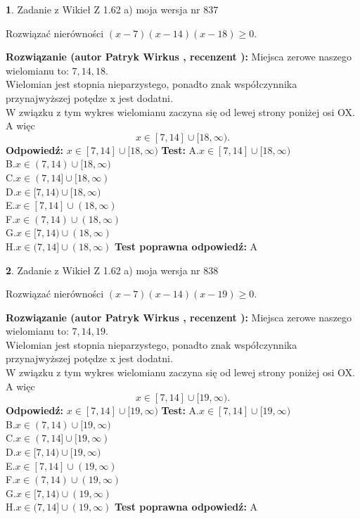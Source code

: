 \documentclass[12pt, a4paper]{article}
\theoremstyle{definition} %
\newtheorem{zad}{}
\newcommand{\zadStart}[1]{\begin{zad}#1\newline}
\newcommand{\zadStop}{\end{zad}}
\newcommand{\rozwStart}[2]{\noindent \textbf{Rozwiązanie (autor #1 , recenzent #2): }\newline}
\newcommand{\rozwStop}{\newline}
\newcommand{\odpStart}{\noindent \textbf{Odpowiedź:}\newline}
\newcommand{\odpStop}{\newline}
\newcommand{\testStart}{\noindent \textbf{Test:}\newline}
\newcommand{\testStop}{\newline}
\newcommand{\kluczStart}{\noindent \textbf{Test poprawna odpowiedź:}\newline}
\newcommand{\kluczStop}{\newline}
\begin{document}
\zadStart{Zadanie z Wikieł Z 1.62 a) moja wersja nr 837}

Rozwiązać nierówności $(x-7)(x-14)(x-18)\ge0$.
\zadStop
\rozwStart{Patryk Wirkus}{}
Miejsca zerowe naszego wielomianu to: $7, 14, 18$.\\
Wielomian jest stopnia nieparzystego, ponadto znak współczynnika przy\linebreak najwyższej potędze x jest dodatni.\\ W związku z tym wykres wielomianu zaczyna się od lewej strony poniżej osi OX. A więc $$x \in [7,14] \cup [18,\infty).$$
\rozwStop
\odpStart
$x \in [7,14] \cup [18,\infty)$
\odpStop
\testStart
A.$x \in [7,14] \cup [18,\infty)$\\
B.$x \in (7,14) \cup [18,\infty)$\\
C.$x \in (7,14] \cup [18,\infty)$\\
D.$x \in [7,14) \cup [18,\infty)$\\
E.$x \in [7,14] \cup (18,\infty)$\\
F.$x \in (7,14) \cup (18,\infty)$\\
G.$x \in [7,14) \cup (18,\infty)$\\
H.$x \in (7,14] \cup (18,\infty)$
\testStop
\kluczStart
A
\kluczStop



\zadStart{Zadanie z Wikieł Z 1.62 a) moja wersja nr 838}

Rozwiązać nierówności $(x-7)(x-14)(x-19)\ge0$.
\zadStop
\rozwStart{Patryk Wirkus}{}
Miejsca zerowe naszego wielomianu to: $7, 14, 19$.\\
Wielomian jest stopnia nieparzystego, ponadto znak współczynnika przy\linebreak najwyższej potędze x jest dodatni.\\ W związku z tym wykres wielomianu zaczyna się od lewej strony poniżej osi OX. A więc $$x \in [7,14] \cup [19,\infty).$$
\rozwStop
\odpStart
$x \in [7,14] \cup [19,\infty)$
\odpStop
\testStart
A.$x \in [7,14] \cup [19,\infty)$\\
B.$x \in (7,14) \cup [19,\infty)$\\
C.$x \in (7,14] \cup [19,\infty)$\\
D.$x \in [7,14) \cup [19,\infty)$\\
E.$x \in [7,14] \cup (19,\infty)$\\
F.$x \in (7,14) \cup (19,\infty)$\\
G.$x \in [7,14) \cup (19,\infty)$\\
H.$x \in (7,14] \cup (19,\infty)$
\testStop
\kluczStart
A
\kluczStop
\end{document}
